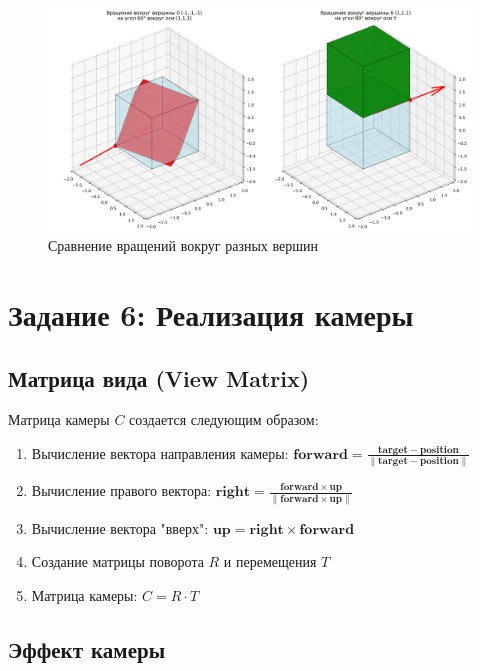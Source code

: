 \begin{figure}[h]
\centering
\includegraphics[width=\textwidth]{images/task5/vertex_rotation_comparison.png}
\caption{Сравнение вращений вокруг разных вершин}
\label{fig:vertex_rotation_comparison}
\end{figure}

\section*{Задание 6: Реализация камеры}

\subsection*{Матрица вида (View Matrix)}

Матрица камеры $C$ создается следующим образом:

\begin{enumerate}
\item Вычисление вектора направления камеры: $\mathbf{forward} = \frac{\mathbf{target} - \mathbf{position}}{\|\mathbf{target} - \mathbf{position}\|}$
\item Вычисление правого вектора: $\mathbf{right} = \frac{\mathbf{forward} \times \mathbf{up}}{\|\mathbf{forward} \times \mathbf{up}\|}$
\item Вычисление вектора "вверх": $\mathbf{up} = \mathbf{right} \times \mathbf{forward}$
\item Создание матрицы поворота $R$ и перемещения $T$
\item Матрица камеры: $C = R \cdot T$
\end{enumerate}

\subsection*{Эффект камеры}


